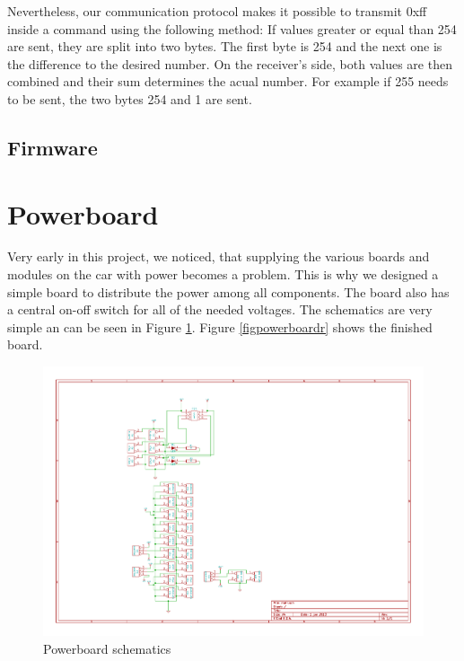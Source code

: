 \documentclass[12pt]{article}
\begin{document}
Nevertheless, our communication protocol makes it possible to transmit 0xff inside a command using the following method:
If values greater or equal than 254 are sent, they are split into two bytes.
The first byte is 254 and the next one is the difference to the desired number.
On the receiver's side, both values are then combined and their sum determines the acual number. 
For example if 255 needs to be sent, the two bytes 254 and 1 are sent.

\subsection{Firmware}

\section{Powerboard}
Very early in this project, we noticed, that supplying the various boards and modules on the car with power becomes a problem.
This is why we designed a simple board to distribute the power among all components.
The board also has a central on-off switch for all of the needed voltages.
The schematics are very simple an can be seen in Figure \ref{figpowerboardscm}. Figure \ref{figpowerboardr} shows the finished board.

\begin{figure}[h]
\begin{center}
\includegraphics[width=20cm,angle=-90]{pic/powerboard}
\caption{Powerboard schematics}
\end{center}
\label{figpowerboardscm}
\end{figure}
\end{document}
